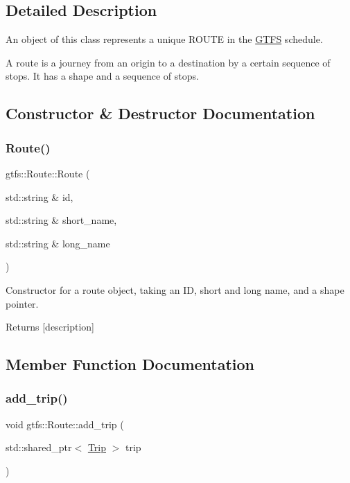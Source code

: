 \subsection{Detailed Description}
An object of this class represents a unique R\+O\+U\+TE in the \hyperlink{classgtfs_1_1GTFS}{G\+T\+FS} schedule.

A route is a journey from an origin to a destination by a certain sequence of stops. It has a shape and a sequence of stops. 

\subsection{Constructor \& Destructor Documentation}
\mbox{\label{classgtfs_1_1Route_a32550fdfee780a26c596172184b86148}} 
\subsubsection{\texorpdfstring{Route()}{Route()}}
{\footnotesize\ttfamily gtfs\+::\+Route\+::\+Route (\begin{DoxyParamCaption}\item[{std\+::string \&}]{id,  }\item[{std\+::string \&}]{short\+\_\+name,  }\item[{std\+::string \&}]{long\+\_\+name }\end{DoxyParamCaption})}

Constructor for a route object, taking an ID, short and long name, and a shape pointer. \begin{DoxyReturn}{Returns}
\mbox{[}description\mbox{]} 
\end{DoxyReturn}


\subsection{Member Function Documentation}
\mbox{\label{classgtfs_1_1Route_aa8a666e5a8f197835764874c983e6601}} 
\subsubsection{\texorpdfstring{add\+\_\+trip()}{add\_trip()}}
{\footnotesize\ttfamily void gtfs\+::\+Route\+::add\+\_\+trip (\begin{DoxyParamCaption}\item[{std\+::shared\+\_\+ptr$<$ \hyperlink{classgtfs_1_1Trip}{Trip} $>$}]{trip }\end{DoxyParamCaption})}


